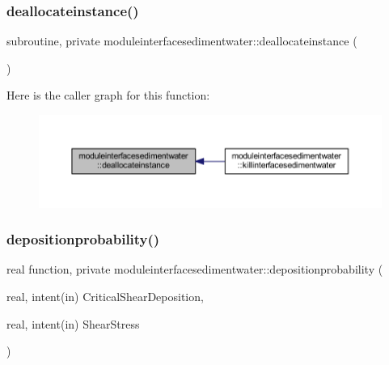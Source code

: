 \subsubsection{\texorpdfstring{deallocateinstance()}{deallocateinstance()}}
{\footnotesize\ttfamily subroutine, private moduleinterfacesedimentwater\+::deallocateinstance (\begin{DoxyParamCaption}{ }\end{DoxyParamCaption})\hspace{0.3cm}{\ttfamily [private]}}

Here is the caller graph for this function\+:\nopagebreak
\begin{figure}[H]
\begin{center}
\leavevmode
\includegraphics[width=350pt]{namespacemoduleinterfacesedimentwater_a0dea9565c188c72edf29abf28839a5ac_icgraph}
\end{center}
\end{figure}
\mbox{\label{namespacemoduleinterfacesedimentwater_a0e44cb6bef52ac05cfb4ad24e8715a5d}} 
\subsubsection{\texorpdfstring{depositionprobability()}{depositionprobability()}}
{\footnotesize\ttfamily real function, private moduleinterfacesedimentwater\+::depositionprobability (\begin{DoxyParamCaption}\item[{real, intent(in)}]{Critical\+Shear\+Deposition,  }\item[{real, intent(in)}]{Shear\+Stress }\end{DoxyParamCaption})\hspace{0.3cm}{\ttfamily [private]}}


